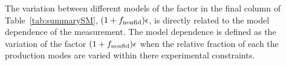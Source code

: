 The variation between different models of the factor in the final column of Table~\ref{tab:summarySM}, $(1+f_{\rm{nonfid}})\epsilon$, is directly related to the model dependence of the measurement. 
The model dependence is defined as the variation of the factor $(1+f_{\rm{nonfid}})\epsilon$ when the relative fraction of each the production modes are varied within there experimental constraints. %
%
%
%
%
